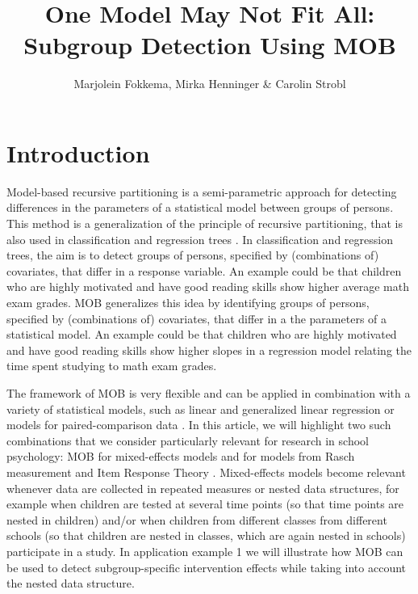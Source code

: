 \documentclass[doc,floatsintext,natbib]{apa7}
\title{One Model May Not Fit All: Subgroup Detection Using MOB}
\author{Marjolein Fokkema, Mirka Henninger \& Carolin Strobl}
\begin{document}

\renewenvironment{Schunk}{\small}{}


\maketitle
{}




\newpage
\section{Introduction}
\label{sec:Introduction}

Model-based recursive partitioning \citep[MOB,][]{ZeilyHoth08} is a semi-parametric approach for detecting differences in the parameters of a statistical
model between groups of persons. This method is a generalization of the principle of recursive partitioning, that is also used in classification and regression trees \citet{Breetal:1984}. 
In classification and regression trees, the aim is to detect groups of persons, specified by (combinations of) covariates, that differ in a response variable. An example could be that children who are highly motivated and have good reading skills show higher average math exam grades. 
MOB generalizes this idea by identifying groups of persons, specified by (combinations of) covariates, that differ in a the parameters of a statistical model. An example could be that children who are highly motivated and have good reading skills show higher slopes in a regression model relating the time spent studying to math exam grades. 

The framework of MOB is very flexible and can be applied in combination with a variety of statistical models, such as linear and generalized linear regression \citep{KopAugStr:2013,ZeilyHoth08} or models for paired-comparison data \citep{StrWicZei:2011:JoEaBS}. In this article, we will highlight two such combinations that we consider particularly relevant for research in school psychology: MOB for mixed-effects models \cite{FokkySmit18} and for models from Rasch measurement and Item Response Theory \citep[IRT,][]{StrKopZei:2015:P,KomStrZei:2017:EaPM,HenDebStr:2023:EPM}. Mixed-effects models become relevant whenever data are collected in repeated measures or nested data structures, for example when children are tested at several time points (so that time points are nested in children) and/or when children from different classes from different schools (so that children are nested in classes, which are again nested in schools) participate in a study. In application example 1 we will illustrate how MOB can be used to detect subgroup-specific intervention effects while taking into account the nested data structure. 
\end{document}
